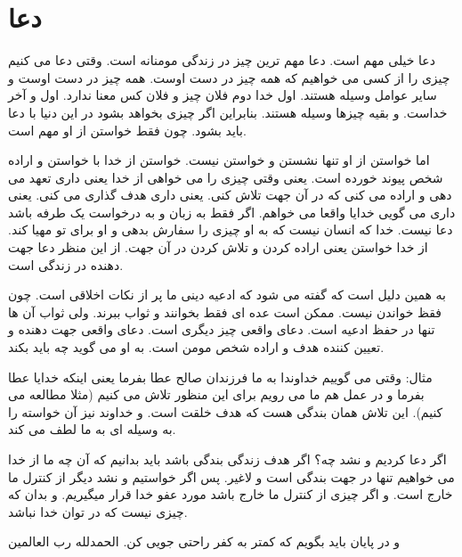 \section{
دعا
}
دعا خیلی مهم است.
دعا مهم ترین چیز در زندگی مومنانه است.
وقتی دعا می کنیم چیزی را از کسی می خواهیم که همه چیز در دست اوست.
همه چیز در دست اوست و سایر عوامل وسیله هستند.
اول خدا دوم فلان چیز و فلان کس معنا ندارد.
اول و آخر خداست.
و بقیه چیزها وسیله هستند.
بنابراین اگر چیزی بخواهد بشود در این دنیا با دعا باید بشود.
چون فقط خواستن از او مهم است.

اما خواستن از او تنها نشستن و خواستن نیست.
خواستن از خدا با خواستن و اراده شخص پیوند خورده است.
یعنی وقتی چیزی را می خواهی از خدا یعنی داری تعهد می دهی و اراده می کنی که در آن جهت تلاش کنی.
یعنی داری هدف گذاری می کنی.
یعنی داری می گویی خدایا واقعا می خواهم.
اگر فقط به زبان و به درخواست یک طرفه باشد دعا نیست.
خدا که انسان نیست که به او چیزی را سفارش بدهی و او برای تو مهیا کند.
از خدا خواستن یعنی اراده کردن و تلاش کردن در آن جهت.
از این منظر دعا جهت دهنده در زندگی است.

به همین دلیل است که گفته می شود که ادعیه دینی ما پر از نکات اخلاقی است.
چون فقظ خواندن نیست.
ممکن است عده ای فقط بخوانند و ثواب ببرند.
ولی ثواب آن ها تنها در حفظ ادعیه است.
دعای واقعی چیز دیگری است.
دعای واقعی جهت دهنده و تعیین کننده هدف و اراده شخص مومن است.
به او می گوید چه باید بکند.

مثال: وقتی می گوییم خداوندا به ما فرزندان صالح عطا بفرما یعنی اینکه خدایا عطا بفرما و در عمل هم ما می رویم برای این منظور تلاش می کنیم (مثلا مطالعه می کنیم).
این تلاش همان بندگی هست که هدف خلقت است.
و خداوند نیز آن خواسته را به وسیله ای به ما لطف می کند.

اگر دعا کردیم و نشد چه؟
اگر هدف زندگی بندگی باشد باید بدانیم که آن چه ما از خدا می خواهیم تنها در جهت بندگی است و لاغیر.
پس اگر خواستیم و نشد دیگر از کنترل ما خارج است.
و اگر چیزی از کنترل ما خارج باشد مورد عفو خدا قرار میگیریم.
و بدان که چیزی نیست که در توان خدا نباشد.


و در پایان باید بگویم که کمتر به کفر راحتی جویی کن.
الحمدلله رب العالمین
